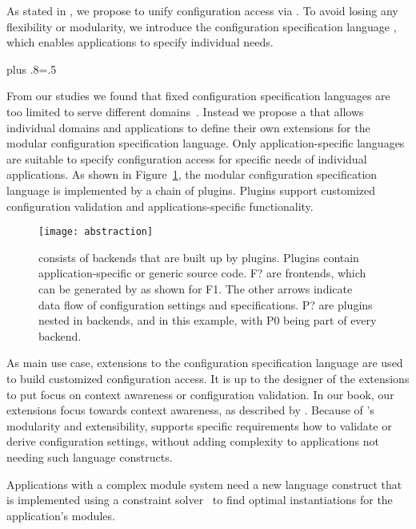 As stated in , we propose to unify configuration access via .
To avoid losing any flexibility or modularity, we introduce the configuration specification language , which enables applications to specify individual needs.%
{\parfillskip=0pt plus .8\textwidth \emergencystretch=.5\textwidth \par}

From our studies we found that fixed configuration specification languages are too limited to serve different domains~\cite{gunther2012software,berger2013survey,magableh2010primitive,friedrich1999consistency}.
Instead we propose a  that allows individual domains and applications to define their own extensions for the modular configuration specification language.
Only application-specific languages are suitable to specify configuration access for specific needs of individual applications.
As shown in Figure~\ref{fig:abstraction}, the modular configuration specification language is implemented by a chain of plugins.
Plugins support customized configuration validation and applications-specific functionality.


\begin{figure}[htp]
\centering
\texttt{[image: abstraction]}
\caption[\elektra{}'s Abstraction.]{ consists of backends that are built up by plugins.
Plugins contain application-specific or generic source code.
F? are frontends, which can be generated by  as shown for F1.
The other arrows indicate data flow of configuration settings and specifications.
P? are plugins nested in backends, and in this example, with P0 being part of every backend.}
\label{fig:abstraction}
\end{figure}

As main use case, extensions to the configuration specification language are used to build customized configuration access.
It is up to the designer of the extensions to put focus on context awareness or configuration validation.
In our book, our extensions focus towards context awareness, as described by .
Because of 's modularity and extensibility, \elektra{} supports specific requirements how to validate or derive configuration settings, without adding complexity to applications not needing such language constructs.

\begin{example}
Applications with a complex module system need a new language construct that is implemented using a constraint solver~\cite{fruhwirth2003essentials} to find optimal instantiations for the application's modules.
\end{example}

